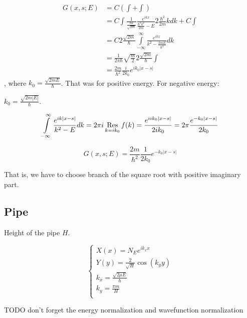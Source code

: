 \documentclass[12pt, a4paper]{article}
\def\res{\mathop{\operatorname{Res}}\limits}
\begin{document}
\begin{align*}
G(x, s; E) &= C (\int + \int) \\
&= C \int \frac{1}{\frac{\hbar k}{\sqrt{2 m}}} \frac{e^{ikx}}{\frac{\hbar^2 k^2}{2m} - E} 2 \frac{\hbar^2}{2 m} k dk + C \int \\
&= C 2 \frac{\sqrt{2m}}{\hbar} \int\limits_{-\infty}^\infty \frac{e^{ikx}}{k^2 - \frac{2mE}{\hbar^2}} dk \\
&= \frac{1}{2 \pi \hbar} \sqrt{\frac{m}{2}} 2 \frac{\sqrt{2 m}}{\hbar} \int  \\
&= \frac{2m}{\hbar^2} \frac{i}{2 k_0} e^{i k_0 |x - s|}
\end{align*}
, where $k_0 = \frac{\sqrt{2 m E}}{\hbar}$. That was for positive energy. For negative energy:

$k_0 = \frac{\sqrt{2m|E|}}{\hbar}$.


$$\int\limits_{-\infty}^\infty \frac{e^{ik|x -s|}}{k^2 - E} dk = 2 \pi i \res\limits_{k = i k_0} f(k) = \frac{e^{i i k_0 |x - s|}}{2 i k_0} = 2 \pi \frac{e^{-k_0 |x - s|}}{2 k_0}$$

$$G(x, s; E) = \frac{2m}{\hbar^2} \frac{1}{2 k_0} e^{-k_0 |x - s|}$$

That is, we have to choose branch of the square root with positive imaginary part.

\subsection{Pipe}

Height of the pipe $H$.

$$\begin{cases}
X(x) = N_E e^{i k_x x} \\
Y(y) = \frac{2}{\sqrt{H}} \cos(k_y y) \\
k_x = \frac{\sqrt{2 \mu E}}{\hbar} \\
k_y = \frac{\pi m}{H} \\
\end{cases}$$

TODO don't forget the energy normalization and wavefunction normalization

\end{document}
